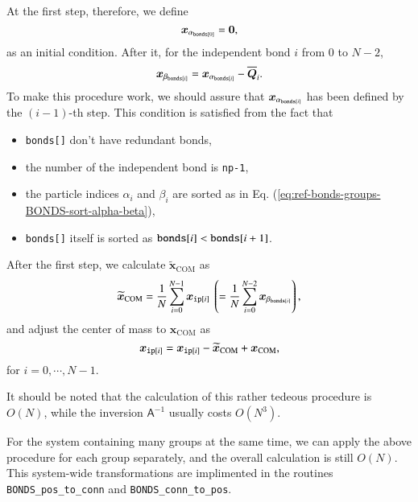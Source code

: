 At the first step, 
therefore, we define 
\begin{equation}
  \bm{x}_{\alpha_{{\tt bonds}[0]}} = \bm{0},
\end{equation}
as an initial condition. 
After it, for the independent bond $i$ from 0 to $N-2$, 
\begin{equation}
  \bm{x}_{\beta_{{\tt bonds}[i]}}
  =
  \bm{x}_{\alpha_{{\tt bonds}[i]}}
  -
  \overline{\bm{Q}}_{i}
  .
\end{equation}
To make this procedure work, 
we should assure that 
$\bm{x}_{\alpha_{{\tt bonds}[i]}}$ has been defined 
by the $(i-1)$-th step. 
This condition is satisfied from the fact that 
\begin{itemize}
\item {\tt bonds[]} don't have redundant bonds,
\item the number of the independent bond is {\tt np-1}, 
\item the particle indices $\alpha_{i}$ and $\beta_{i}$ are 
  sorted as in Eq. (\ref{eq:ref-bonds-groups-BONDS-sort-alpha-beta}),
\item {\tt bonds[]} itself is sorted as 
  ${\tt bonds}[i] < {\tt bonds}[i+1]$.
\end{itemize}

After the first step, 
we calculate $\widetilde{\bm{x}}_{\text{COM}}$ as 
\begin{equation}
  \widetilde{\bm{x}}_{\text{COM}}
  =
  \frac{1}{N}
  \sum_{i=0}^{N-1}
  \bm{x}_{{\tt ip}[i]}
  \ 
  \left(
    =
    \frac{1}{N}
    \sum_{i=0}^{N-2}
    \bm{x}_{\beta_{{\tt bonds}[i]}}
  \right)
  ,
\end{equation}
and adjust the center of mass to $\bm{x}_{\text{COM}}$ as 
\begin{equation}
  \bm{x}_{{\tt ip}[i]}
  =
  \bm{x}_{{\tt ip}[i]}
  -
  \widetilde{\bm{x}}_{\text{COM}}
  +
  \bm{x}_{\text{COM}}
  ,
\end{equation}
for $i = 0, \cdots, N-1$.

It should be noted that 
the calculation of this rather tedeous procedure is $O(N)$, 
while the inversion $\mathsf{A}^{-1}$ usually costs $O(N^3)$. 

For the system containing many groups at the same time, 
we can apply the above procedure for each group separately, 
and the overall calculation is still $O(N)$. 
This system-wide transformations are implimented in the routines 
{\tt BONDS\_pos\_to\_conn} and {\tt BONDS\_conn\_to\_pos}. 


